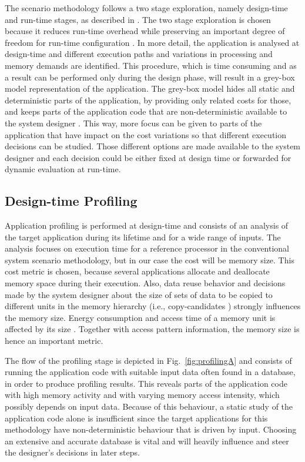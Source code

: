 The scenario methodology follows a two stage exploration, namely design-time and run-time stages, as described in \cite{Gheorghita2007}. The two stage exploration is chosen because it reduces run-time overhead while preserving an important degree of freedom for run-time configuration \cite{tcm}. In more detail, the application is analysed at design-time and different execution paths and variations in processing and memory demands are identified. This procedure, which is time consuming and as a result can be performed only during the design phase, will result in a grey-box model representation of the application. The grey-box model hides all static and deterministic parts of the application, by providing only related costs for those, and keeps parts of the application code that are non-deterministic available to the system designer \cite{graybox}. This way, more focus can be given to parts of the application that have impact on the cost variations so that different execution decisions can be studied. Those different options are made available to the system designer and each decision could be either fixed at design time or forwarded for dynamic evaluation at run-time.

\subsection{Design-time Profiling}

Application profiling is performed at design-time and consists of an analysis of the target application during its lifetime and for a wide range of inputs. The analysis focuses on execution time for a reference processor in the conventional system scenario methodology, but in our case the cost will be memory size. This cost metric is chosen, because several applications allocate and deallocate memory space during their execution. Also, data reuse behavior and decisions made by the system designer about the size of sets of data to be copied to different units in the memory hierarchy (i.e., copy-candidates \cite{dtse}) strongly influences the memory size. Energy consumption and access time of a memory unit is affected by its size \cite{patterson}. Together with access pattern information, the memory size is hence an important metric.

The flow of the profiling stage is depicted in Fig.~\ref{fig:profilingA} and consists of running the application code with suitable input data often found in a database, in order to produce profiling results. This reveals parts of the application code with high memory activity and with varying memory access intensity, which possibly depends on input data. Because of this behaviour, a static study of the application code alone is insufficient since the target applications for this methodology have non-deterministic behaviour that is driven by input. Choosing an extensive and accurate database is vital and will heavily influence and steer the designer's decisions in later steps.

